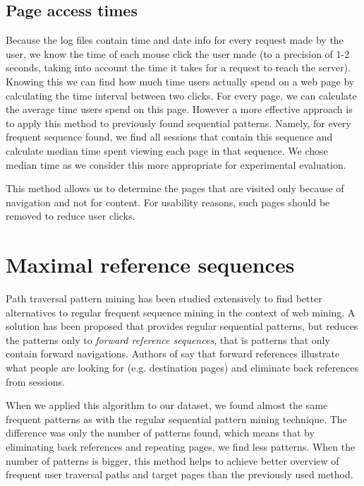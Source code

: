 \documentclass[english,a4paper]{article}
\begin{document}
\subsection{Page access times}
Because the log files contain time and date info for every request made by the user, we know the time of each mouse click the user made (to a precision of 1-2 seconds, taking into account the time it takes for a request to reach the server). Knowing this we can find how much time users actually spend on a web page by calculating the time interval between two clicks. For every page, we can calculate the average time users spend on this page. However a more effective approach is to apply this method to previously found sequential patterns. Namely, for every frequent sequence found, we find all sessions that contain this sequence and calculate median time spent viewing each page in that sequence. We chose median time as we consider this more appropriate for experimental evaluation.

This method allows us to determine the pages that are visited only because of navigation and not for content. For usability reasons, such pages should be removed to reduce user clicks.





\section{Maximal reference sequences}
Path traversal pattern mining has been studied extensively to find better alternatives to regular frequent sequence mining in the context of web mining. A solution has been proposed \cite{path_patterns} that provides regular sequential patterns, but reduces the patterns only to \emph{forward reference sequences}, that is patterns that only contain forward navigations. Authors of \cite{path_patterns} say that forward references illustrate what people are looking for (e.g. destination pages) and eliminate back references from sessions.

When we applied this algorithm to our dataset, we found almost the same frequent patterns as with the regular sequential pattern mining technique. The difference was only the number of patterns found, which means that by eliminating back references and repeating pages, we find less patterns. When the number of patterns is bigger, this method helps to achieve better overview of frequent user traversal paths and target pages than the previously used method.
\end{document}
